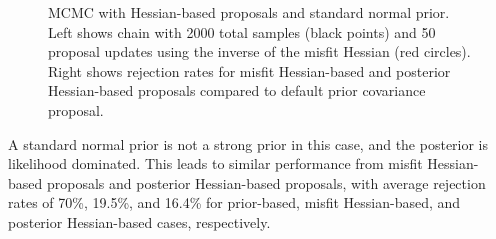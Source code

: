 \begin{figure}[htbp]
  \begin{subfigmatrix}{2}
  \end{subfigmatrix}
  \caption{MCMC with Hessian-based proposals and standard normal prior. Left shows chain with 2000 total samples (black points) and 50 proposal updates using the inverse of the misfit Hessian (red circles). Right shows rejection rates for misfit Hessian-based and posterior Hessian-based proposals compared to default prior covariance proposal.}
\label{fig:rosen_restart}
\end{figure}
A standard normal prior is not a strong prior in this case, and
the posterior is likelihood dominated.  This leads to similar
performance from misfit Hessian-based proposals and posterior
Hessian-based proposals, with average rejection rates of 70\%, 19.5\%,
and 16.4\% for prior-based, misfit Hessian-based, and posterior
Hessian-based cases, respectively.
